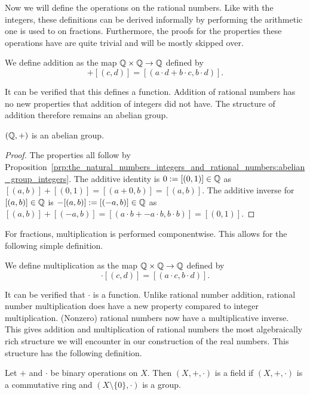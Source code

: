 \documentclass[../main.tex]{subfiles}
\begin{document}
Now we will define the operations on the rational numbers. Like with the integers, these definitions can be derived informally by performing the arithmetic one is used to on fractions. Furthermore, the proofs for the properties these operations have are quite trivial and will be mostly skipped over.
\begin{definition}
    We define addition as the map $\mathbb{Q}\times\mathbb{Q}\to\mathbb{Q}$ defined by
    \begin{equation*}
        [(a,b)]+[(c,d)]=[(a\cdot d+b\cdot c,b\cdot d)].
    \end{equation*}
\end{definition}
It can be verified that this defines a function. Addition of rational numbers has no new properties that addition of integers did not have. The structure of addition therefore remains an abelian group.
\begin{proposition}\label{prp:the_natural_numbers_integers_and_rational_numbers:abelian_group_rational_numbers}
    $(\mathbb{Q},+)$ is an abelian group.
\end{proposition}
\begin{proof}
    The properties all follow by Proposition~\ref{prp:the_natural_numbers_integers_and_rational_numbers:abelian_group_integers}. The additive identity is $0:=[(0,1)]\in\mathbb{Q}$ as $[(a,b)]+[(0,1)]=[(a+0,b)]=[(a,b)]$. The additive inverse for $[(a,b)]\in\mathbb{Q}$ is $-[(a,b)]:=[(-a,b)]\in\mathbb{Q}$ as $[(a,b)]+[(-a,b)]=[(a\cdot b+-a\cdot b,b\cdot b)]=[(0,1)]$.
\end{proof}
For fractions, multiplication is performed componentwise. This allows for the following simple definition.
\begin{definition}
    We define multiplication as the map $\mathbb{Q}\times\mathbb{Q}\to\mathbb{Q}$ defined by
    \begin{equation*}
        [(a,b)]\cdot[(c,d)]=[(a\cdot c,b\cdot d)].
    \end{equation*}
\end{definition}
It can be verified that $\cdot$ is a function. Unlike rational number addition, rational number multiplication does have a new property compared to integer multiplication. (Nonzero) rational numbers now have a multiplicative inverse. This gives addition and multiplication of rational numbers the most algebraically rich structure we will encounter in our construction of the real numbers. This structure has the following definition.
\begin{definition}[Field]
    Let $+$ and $\cdot$ be binary operations on $X$. Then $(X,+,\cdot)$ is a field if $(X,+,\cdot)$ is a commutative ring and $(X\setminus\{0\},\cdot)$ is a group.
\end{definition}
\end{document}
